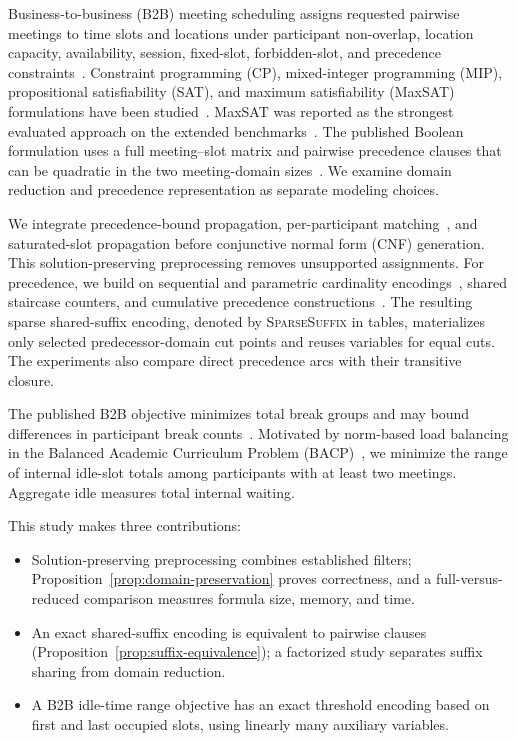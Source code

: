\documentclass[conference,a4paper]{IEEEtran}
\newcommand{\revised}[1]{#1}
\begin{document}
Business-to-business (B2B) meeting scheduling assigns requested pairwise meetings to time slots and locations under participant non-overlap, location capacity, availability, session, fixed-slot, forbidden-slot, and precedence constraints~\cite{pesant2015,bofill2022}.  Constraint programming (CP), mixed-integer programming (MIP), propositional satisfiability (SAT), and maximum satisfiability (MaxSAT) formulations have been studied~\cite{bofill2015,bofill2019}.  MaxSAT was reported as the strongest evaluated approach on the extended benchmarks~\cite{bofill2022}.  The published Boolean formulation uses a full meeting--slot matrix and pairwise precedence clauses that can be quadratic in the two meeting-domain sizes~\cite{bofill2022}.  We examine domain reduction and precedence representation as separate modeling choices.

We integrate precedence-bound propagation, per-participant matching~\cite{regin1994}, and saturated-slot propagation before conjunctive normal form (CNF) generation.  This solution-preserving preprocessing removes unsupported assignments.  For precedence, we build on sequential and parametric cardinality encodings~\cite{sinz2005,abio2013}, shared staircase counters, and cumulative precedence constructions~\cite{truong2025,vankieu2025compact}.  The resulting sparse shared-suffix encoding, denoted by \mbox{\textnormal{\textsc{SparseSuffix}}} in tables, materializes only selected predecessor-domain cut points and reuses variables for equal cuts.  The experiments also compare direct precedence arcs with their transitive closure.

\revised{The published B2B objective minimizes total break groups and may bound differences in participant break counts~\cite{bofill2022}. Motivated by norm-based load balancing in the Balanced Academic Curriculum Problem (BACP)~\cite{chiarandini2012}, we minimize the range of internal idle-slot totals among participants with at least two meetings. Aggregate idle measures total internal waiting.}

This study makes three contributions:
\begin{itemize}
    \item \revised{Solution-preserving preprocessing combines established filters; Proposition~\ref{prop:domain-preservation} proves correctness, and a full-versus-reduced comparison measures formula size, memory, and time.}
    \item \revised{An exact shared-suffix encoding is equivalent to pairwise clauses (Proposition~\ref{prop:suffix-equivalence}); a factorized study separates suffix sharing from domain reduction.}
    \item \revised{A B2B idle-time range objective has an exact threshold encoding based on first and last occupied slots, using linearly many auxiliary variables.}
\end{itemize}
\end{document}
